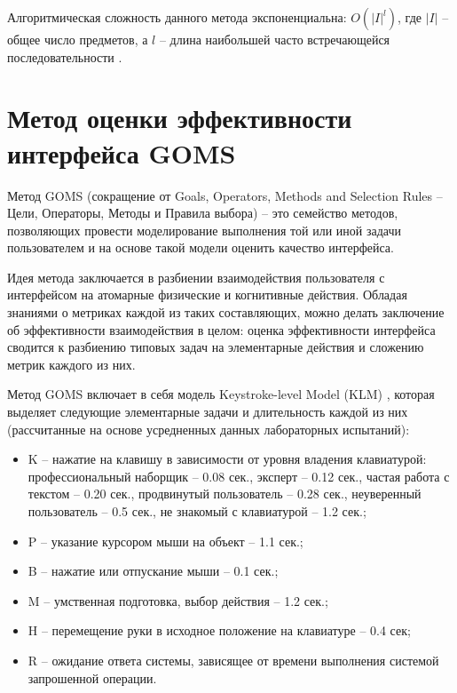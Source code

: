 
Алгоритмическая сложность данного метода экспоненциальна: $O(|I|^l)$, где $|I|$ -- общее число предметов, а $l$ -- длина наибольшей часто встречающейся последовательности \cite{Data_mining_book}.

\section{Метод оценки эффективности интерфейса GOMS}
Метод GOMS (сокращение от Goals, Operators, Methods and Selection Rules -- Цели, Операторы, Методы и Правила выбора) -- это семейство методов, позволяющих провести моделирование выполнения той или иной задачи пользователем и на основе такой модели оценить качество интерфейса.

Идея метода заключается в разбиении взаимодействия пользователя с интерфейсом на атомарные физические и когнитивные действия. Обладая знаниями о метриках каждой из таких составляющих, можно делать заключение об эффективности взаимодействия в целом: оценка
эффективности интерфейса сводится к разбиению типовых задач на элементарные действия и сложению метрик каждого из них.

Метод GOMS включает в себя модель Keystroke-level Model (KLM) \cite{11}, которая выделяет следующие элементарные задачи и длительность каждой из них (рассчитанные на основе усредненных данных лабораторных испытаний):

\begin{itemize}
	\item K – нажатие на клавишу в зависимости от уровня владения клавиатурой: профессиональный	наборщик – 0.08 сек., эксперт – 0.12 сек., частая работа с текстом – 0.20 сек., продвинутый пользователь – 0.28 сек., неуверенный пользователь – 0.5 сек., не знакомый с клавиатурой – 1.2 сек.;
	\item P – указание курсором мыши на объект – 1.1 сек.;
	\item B – нажатие или отпускание мыши – 0.1 сек.;
	\item M – умственная подготовка, выбор действия – 1.2 сек.;
	\item H – перемещение руки в исходное положение на клавиатуре – 0.4 сек;
	\item R – ожидание ответа системы, зависящее от	времени выполнения системой запрошенной операции.
\end{itemize}

